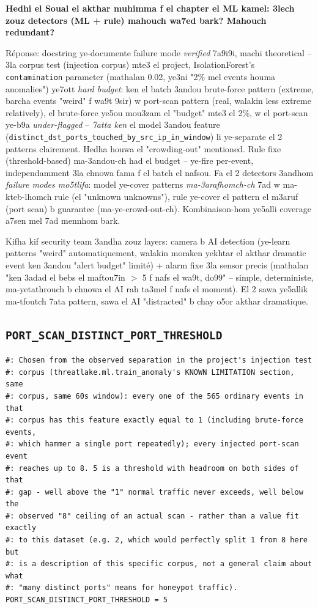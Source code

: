 \documentclass[11pt,a4paper]{report}
\DeclareRobustCommand{\code}[1]{\texttt{#1}}
\begin{document}
\begin{soual}
\textbf{Hedhi el Soual el akthar muhimma f el chapter el ML kamel: 3lech
zouz detectors (ML + rule) mahouch wa7ed bark? Mahouch redundant?}

Réponse: docstring ye-documente failure mode \emph{verified} 7a9i9i, machi
theoretical -- 3la corpus test (injection corpus) mte3 el project,
IsolationForest's \code{contamination} parameter (mathalan 0.02, ye3ni
"2\% mel events houma anomalies") ye7ott \emph{hard budget}: ken el batch
3andou brute-force pattern (extreme, barcha events "weird" f wa9t 9sir)
w port-scan pattern (real, walakin less extreme relatively), el
brute-force ye5ou mou3zam el "budget" mte3 el 2\%, w el port-scan ye-b9a
\emph{under-flagged} -- \emph{7atta ken} el model 3andou feature
(\code{distinct\_dst\_ports\_touched\_by\_src\_ip\_in\_window}) li
ye-separate el 2 patterns clairement. Hedha houwa el "crowding-out"
mentioned. Rule fixe (threshold-based) ma-3andou-ch had el budget --
ye-fire per-event, independamment 3la chnowa fama f el batch el nafsou.
Fa el 2 detectors 3andhom \emph{failure modes mo5tlifa}: model ye-cover
patterns \emph{ma-3arafhomch-ch} 7ad w ma-kteb-lhomch rule (el "unknown
unknowns"), rule ye-cover el pattern el m3aruf (port scan) b guarantee
(ma-ye-crowd-out-ch). Kombinaison-hom ye5alli coverage a7sen mel 7ad
mennhom bark.
\end{soual}

\begin{analogy}
Kifha kif security team 3andha zouz layers: camera b AI detection (ye-learn
patterns "weird" automatiquement, walakin momken yekhtar el akthar dramatic
event ken 3andou "alert budget" limité) + alarm fixe 3la sensor precis
(mathalan "ken 3adad el bebs el maftou7in $>$ 5 f nafs el wa9t, do99" --
simple, deterministe, ma-yetathrouch b chnowa el AI rah ta3mel f nafs el
moment). El 2 sawa ye5allik ma-tfoutch 7ata pattern, sawa el AI "distracted"
b chay o5or akthar dramatique.
\end{analogy}

\subsection{\code{PORT\_SCAN\_DISTINCT\_PORT\_THRESHOLD}}

\begin{lstlisting}[style=pystyle]
#: Chosen from the observed separation in the project's injection test
#: corpus (threatlake.ml.train_anomaly's KNOWN LIMITATION section, same
#: corpus, same 60s window): every one of the 565 ordinary events in that
#: corpus has this feature exactly equal to 1 (including brute-force events,
#: which hammer a single port repeatedly); every injected port-scan event
#: reaches up to 8. 5 is a threshold with headroom on both sides of that
#: gap - well above the "1" normal traffic never exceeds, well below the
#: observed "8" ceiling of an actual scan - rather than a value fit exactly
#: to this dataset (e.g. 2, which would perfectly split 1 from 8 here but
#: is a description of this specific corpus, not a general claim about what
#: "many distinct ports" means for honeypot traffic).
PORT_SCAN_DISTINCT_PORT_THRESHOLD = 5
\end{lstlisting}
\end{document}
